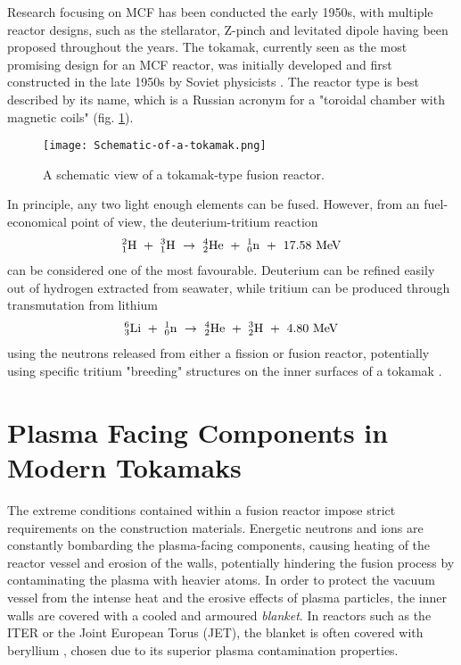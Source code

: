 Research focusing on MCF has been conducted the early 1950s, with multiple reactor designs, such as the stellarator, Z-pinch and levitated dipole having been proposed throughout the years. 
The tokamak, currently seen as the most promising design for an MCF reactor, was initially developed and first constructed in the late 1950s by Soviet physicists \cite{tokamakorigins}. 
The reactor type is best described by its name, which is a Russian acronym for a "toroidal chamber with magnetic coils" (fig. \ref{fig:tokamak}).

\begin{figure}[!ht]
\center
\texttt{[image: Schematic-of-a-tokamak.png]}
\caption{A schematic view of a tokamak-type fusion reactor.} 
\label{fig:tokamak}
\end{figure}

In principle, any two light enough elements can be fused. 
However, from an fuel-economical point of view, the deuterium-tritium reaction 
\begin{align}
^2_1\rm{H} ~+~ ^3_1\rm{H} ~\rightarrow~ ^4_2\rm{He} ~+~ ^1_0\rm{n} ~+~ 17.58 ~\rm{MeV}
\label{Eq:D-T-reaction}
\end{align}
can be considered one of the most favourable. 
Deuterium can be refined easily out of hydrogen extracted from seawater, while tritium can be produced through transmutation from lithium
\begin{align}
^6_3\rm{Li} ~+~ ^1_0\rm{n} ~\rightarrow~ ^4_2\rm{He} ~+~ ^3_2\rm{H} ~+~ 4.80  ~\rm{MeV}
\end{align}
using the neutrons released from either a fission or fusion reactor, potentially using specific tritium "breeding" structures on the inner surfaces of a tokamak \cite{giancarli2012overview}.


\section{Plasma Facing Components in Modern Tokamaks}

The extreme conditions contained within a fusion reactor impose strict requirements on the construction materials. 
Energetic neutrons and ions are constantly bombarding the plasma-facing components, causing heating of the reactor vessel and erosion of the walls, potentially hindering the fusion process by contaminating the plasma with heavier atoms. 
In order to protect the vacuum vessel from the intense heat and the erosive effects of plasma particles, the inner walls are covered with a cooled and armoured \textit{blanket}. 
In reactors such as the ITER or the Joint European Torus (JET), the blanket is often covered with beryllium \cite{raffray2012overview}, chosen due to its superior plasma contamination properties.

